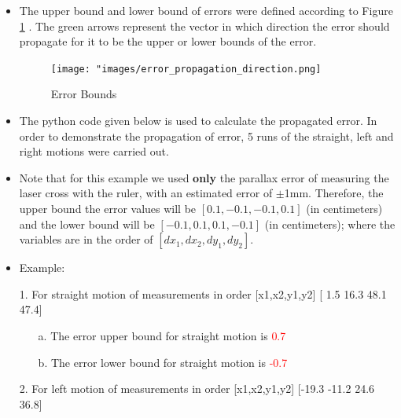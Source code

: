 {\begin{itemize}
           
            
               
          \item The upper bound and lower bound of errors were defined according to Figure \ref{fig:Error Bounds} . The green arrows represent the vector in which direction the error should propagate for it to be the upper or lower bounds of the error.    
          
          \begin{figure}[ht!] 
                        \centering
                        \texttt{[image: "images/error\_propagation\_direction.png]}
                        \caption{Error Bounds}
                        \label{fig:Error Bounds}
         \end{figure}
                
                
            
        \item The python code given below is used to calculate the propagated error. In order to demonstrate the propagation of error, 5 runs of the straight, left and right motions were carried out. 
        
        \item Note that for this example we used \textbf{only} the parallax error of measuring the laser cross with the ruler, with an estimated error of $\pm$1mm. Therefore, the upper bound the error values will be $[0.1, -0.1, -0.1, 0.1]$ (in centimeters) and the lower bound will be $[-0.1, 0.1, 0.1, -0.1]$ (in centimeters); where the variables are in the order of $[dx_1, dx_2, dy_1, dy_2]$.
        
        \item Example:
        
        \item[1.] For straight motion of measurements in order [x1,x2,y1,y2] [ 1.5 16.3 48.1 47.4]
        
        \begin{itemize}
            \item[a.] The error upper bound for straight motion is \textcolor{red}{0.7 \textdegree}
            \item[b.] The error lower bound for straight motion is \textcolor{red}{-0.7 \textdegree}
        \end{itemize}
        
        \item[2.] For left motion of measurements in order [x1,x2,y1,y2] [-19.3 -11.2  24.6  36.8]
        

\end{itemize}}
